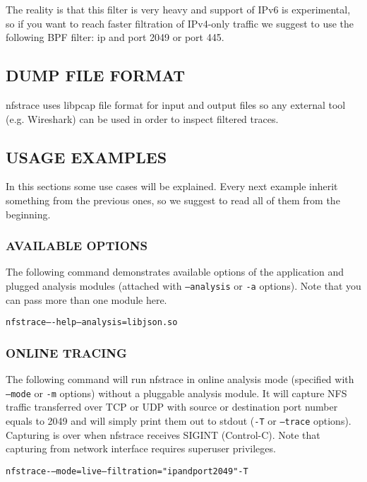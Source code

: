 \documentclass[oneside]{article}
\newcommand{\code}[1]{\texttt{#1}}
\newcommand{\gls}{}
\newcommand*{\textfile}[1]{\textsf{#1}}
\newcommand*{\textprog}[1]{\textfile{#1}}
\begin{document}
The reality is that this filter is very heavy and support of IPv6 is
experimental, so if you want to reach faster filtration of IPv4-only traffic we
suggest to use the following \gls{BPF} filter: \textprog{ip and port 2049 or port
445}.

\subsection{DUMP FILE FORMAT}
\label{sec:dumpfileformat}

\textprog{nfstrace} uses libpcap file format for input and output files so any
external tool (e.g. \gls{Wireshark}) can be used in order to inspect filtered
traces.

\subsection{USAGE EXAMPLES}

In this sections some use cases will be explained. Every next example inherit
something from the previous ones, so we suggest to read all of them from the
beginning.  

\subsubsection{AVAILABLE OPTIONS}

The following command demonstrates available options of the application and
plugged analysis modules (attached with \code{--analysis} or \code{-a} options). Note that
you can pass more than one module here.
\begin{alltt}
nfstrace –-help --analysis=libjson.so
\end{alltt}

\subsubsection{ONLINE TRACING}

The following command will run \textprog{nfstrace} in online analysis mode (specified with
\code{--mode} or \code{-m} options) without a pluggable analysis module. It will capture
\gls{NFS} traffic transferred over TCP or UDP with source or destination port
number equals to 2049 and will simply print them out to stdout (\code{-T} or \code{--trace}
options). Capturing is over when \textprog{nfstrace} receives \textprog{SIGINT} (Control-C).  Note
that capturing from network interface requires superuser privileges.

\begin{alltt} 
nfstrace -–mode=live --filtration="ip and port 2049" -T 
\end{alltt}
\end{document}
